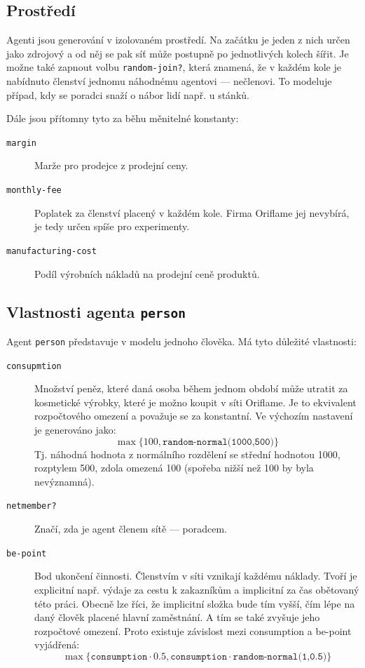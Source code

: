 \documentclass[a4wide,12pt]{report}
\begin{document}
\subsection{Prostředí}
Agenti jsou generování v izolovaném prostředí. Na začátku je jeden z nich určen jako zdrojový a od něj se pak síť může postupně po jednotlivých kolech šířit. Je možne také zapnout volbu \texttt{random-join?}, která znamená, že v každém kole je nabídnuto členství jednomu náhodnému agentovi --- nečlenovi. To modeluje případ, kdy se poradci snaží o nábor lidí např. u stánků.

Dále jsou přítomny tyto za běhu měnitelné konstanty:
\begin{description}
\item[\texttt{margin}] Marže pro prodejce z prodejní ceny.
\item[\texttt{monthly-fee}] Poplatek za členství placený v každém kole. Firma Oriflame jej nevybírá, je tedy určen spíše pro experimenty.
\item[\texttt{manufacturing-cost}] Podíl výrobních nákladů na prodejní ceně produktů.
\end{description}
\subsection{Vlastnosti agenta \texttt{person}}
\label{sec:vl_agenta}
Agent \texttt{person} představuje v modelu jednoho člověka. Má tyto důležité vlastnosti:
\begin{description}
\item[\texttt{consupmtion}] Množství peněz, které daná osoba během jednom období může utratit za kosmetické výrobky, které je možno koupit v síti Oriflame. Je to ekvivalent rozpočtového omezení a považuje se za konstantní. Ve výchozím nastavení je generováno jako:
$$\max\{100,\texttt{random-normal(1000,500)}\}$$
Tj. náhodná hodnota z normálního rozdělení se střední hodnotou 1000, rozptylem 500, zdola omezená 100 (spořeba nižší než 100 by byla nevýznamná).
\item[\texttt{netmember?}] Značí, zda je agent členem sítě --- poradcem.
\item[\texttt{be-point}] Bod ukončení činnosti. Členstvím v síti vznikají každému náklady. Tvoří je explicitní např. výdaje za cestu k zakazníkům a implicitní za čas obětovaný této práci. Obecně lze říci, že implicitní složka bude tím vyšší, čím lépe na daný člověk placené hlavní zaměstnání. A tím se také zvyšuje jeho rozpočtové omezení. Proto existuje závislost mezi consumption a be-point vyjádřená:
$$\max\{\texttt{consumption}\cdot 0.5,\texttt{consumption}\cdot\texttt{random-normal(1,0.5)}\}$$
\end{description}
\end{document}
